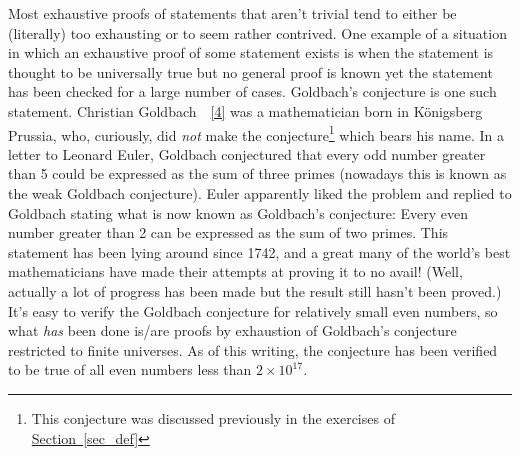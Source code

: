 \documentclass[10pt,]{book}
\theoremstyle{plain}
\theoremstyle{definition}
\theoremstyle{definition}
\numberwithin{equation}{section}
\begin{document}
    Most exhaustive proofs of statements that aren't trivial tend to either be (literally) too exhausting or to seem rather contrived. One example of a situation
    in which an exhaustive proof of some statement exists is when the statement
    is thought to be universally true but no general proof is known \textemdash{} yet the
    statement has been checked for a large number of cases.
    Goldbach's conjecture
    is one such statement.
    Christian Goldbach~~\hyperlink{wiki-goldbach}{[4]}
    was a mathematician born
    in Königsberg Prussia,
    who, curiously, did \emph{not} make the
    conjecture\footnote{This conjecture was 
    discussed previously in the exercises of \hyperref[sec_def]{Section~\ref{sec_def}}\label{fn-24}} which bears
    his name. In a letter to
    Leonard Euler, Goldbach conjectured that every
    odd number greater than 5 could be expressed as the sum of three primes (nowadays this is known as the
     weak Goldbach conjecture). Euler apparently liked the
    problem and replied to Goldbach stating what is now known as Goldbach's
    conjecture: Every even number greater than 2 can be expressed as the sum of
    two primes. This statement has been lying around since 1742, and a great
    many of the world's best mathematicians have made their attempts at proving it \textemdash{} to no avail! (Well, actually a lot of progress has been made but the result
    still hasn't been proved.) It's easy to verify the Goldbach conjecture for
    relatively small even numbers, so what \emph{has} been done is/are proofs by
    exhaustion of Goldbach's conjecture restricted to finite universes.
    As of this writing, the conjecture has been verified to be true of
    all even numbers less than \(2 \times 10^{17}\).
\par
\end{document}
